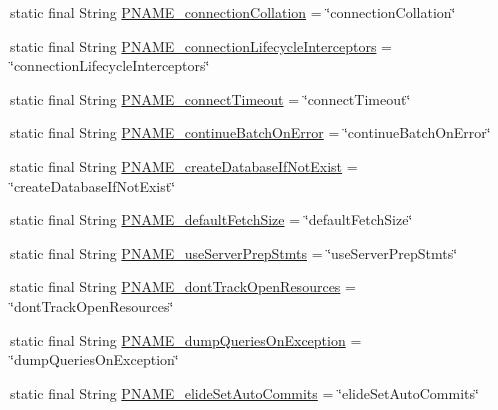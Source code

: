 \begin{DoxyCompactItemize}
\item 
static final String \mbox{\hyperlink{classcom_1_1mysql_1_1cj_1_1conf_1_1_property_definitions_a49a22e61af822db16f5b864d2095fe59}{P\+N\+A\+M\+E\+\_\+connection\+Collation}} = \char`\"{}connection\+Collation\char`\"{}
\item 
static final String \mbox{\hyperlink{classcom_1_1mysql_1_1cj_1_1conf_1_1_property_definitions_ac11f0bfa305a24e52187164386493e89}{P\+N\+A\+M\+E\+\_\+connection\+Lifecycle\+Interceptors}} = \char`\"{}connection\+Lifecycle\+Interceptors\char`\"{}
\item 
static final String \mbox{\hyperlink{classcom_1_1mysql_1_1cj_1_1conf_1_1_property_definitions_a43cf3b18674e312a133f46f084989700}{P\+N\+A\+M\+E\+\_\+connect\+Timeout}} = \char`\"{}connect\+Timeout\char`\"{}
\item 
static final String \mbox{\hyperlink{classcom_1_1mysql_1_1cj_1_1conf_1_1_property_definitions_acc6fa852d2423f323954e5d5b305dd6b}{P\+N\+A\+M\+E\+\_\+continue\+Batch\+On\+Error}} = \char`\"{}continue\+Batch\+On\+Error\char`\"{}
\item 
static final String \mbox{\hyperlink{classcom_1_1mysql_1_1cj_1_1conf_1_1_property_definitions_abd2f85651b9c1a0e465d4d3f581d12d8}{P\+N\+A\+M\+E\+\_\+create\+Database\+If\+Not\+Exist}} = \char`\"{}create\+Database\+If\+Not\+Exist\char`\"{}
\item 
static final String \mbox{\hyperlink{classcom_1_1mysql_1_1cj_1_1conf_1_1_property_definitions_ab3e6d7f782af8348e1e3106fddb8c891}{P\+N\+A\+M\+E\+\_\+default\+Fetch\+Size}} = \char`\"{}default\+Fetch\+Size\char`\"{}
\item 
static final String \mbox{\hyperlink{classcom_1_1mysql_1_1cj_1_1conf_1_1_property_definitions_aec2d952edb995ad29455af0db809936d}{P\+N\+A\+M\+E\+\_\+use\+Server\+Prep\+Stmts}} = \char`\"{}use\+Server\+Prep\+Stmts\char`\"{}
\item 
static final String \mbox{\hyperlink{classcom_1_1mysql_1_1cj_1_1conf_1_1_property_definitions_a0a9de8d96dfff9f008092e5285b7c4be}{P\+N\+A\+M\+E\+\_\+dont\+Track\+Open\+Resources}} = \char`\"{}dont\+Track\+Open\+Resources\char`\"{}
\item 
static final String \mbox{\hyperlink{classcom_1_1mysql_1_1cj_1_1conf_1_1_property_definitions_af3c98169e9425d122861d2ee4a61d81a}{P\+N\+A\+M\+E\+\_\+dump\+Queries\+On\+Exception}} = \char`\"{}dump\+Queries\+On\+Exception\char`\"{}
\item 
static final String \mbox{\hyperlink{classcom_1_1mysql_1_1cj_1_1conf_1_1_property_definitions_a6d8f17d3fbf751c846003db86b6ec7ae}{P\+N\+A\+M\+E\+\_\+elide\+Set\+Auto\+Commits}} = \char`\"{}elide\+Set\+Auto\+Commits\char`\"{}

\end{DoxyCompactItemize}
